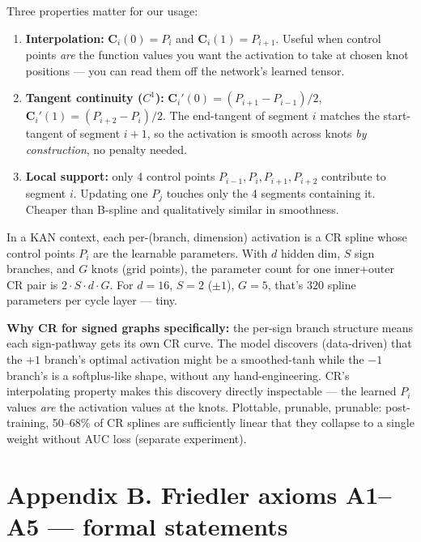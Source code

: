\documentclass[11pt,a4paper]{article}
\begin{document}
Three properties matter for our usage:

\begin{enumerate}
\item \textbf{Interpolation:} $\mathbf{C}_i(0) = P_i$ and
      $\mathbf{C}_i(1) = P_{i+1}$. Useful when control points
      \emph{are} the function values you want the activation to take
      at chosen knot positions --- you can read them off the network's
      learned tensor.
\item \textbf{Tangent continuity ($C^1$):}
      $\mathbf{C}_i'(0) = (P_{i+1} - P_{i-1})/2$,
      $\mathbf{C}_i'(1) = (P_{i+2} - P_i)/2$.
      The end-tangent of segment $i$ matches the start-tangent of
      segment $i{+}1$, so the activation is smooth across knots
      \emph{by construction}, no penalty needed.
\item \textbf{Local support:} only 4 control points $P_{i-1}, P_i,
      P_{i+1}, P_{i+2}$ contribute to segment $i$. Updating one
      $P_j$ touches only the 4 segments containing it. Cheaper than
      B-spline and qualitatively similar in smoothness.
\end{enumerate}

In a KAN context, each per-(branch, dimension) activation is a CR
spline whose control points $P_i$ are the learnable parameters. With
$d$ hidden dim, $S$ sign branches, and $G$ knots (grid points), the
parameter count for one inner+outer CR pair is $2 \cdot S \cdot d
\cdot G$. For $d{=}16$, $S{=}2$ ($\pm 1$), $G{=}5$, that's $320$
spline parameters per cycle layer --- tiny.

\textbf{Why CR for signed graphs specifically:} the per-sign branch
structure means each sign-pathway gets its own CR curve. The model
discovers (data-driven) that the $+1$ branch's optimal activation
might be a smoothed-tanh while the $-1$ branch's is a softplus-like
shape, without any hand-engineering. CR's interpolating property
makes this discovery directly inspectable --- the learned $P_i$
values \emph{are} the activation values at the knots. Plottable,
prunable, prunable: post-training, 50--68\% of CR splines are
sufficiently linear that they collapse to a single weight without
AUC loss (separate experiment).

\section*{Appendix B. Friedler axioms A1--A5 --- formal statements}
\end{document}
